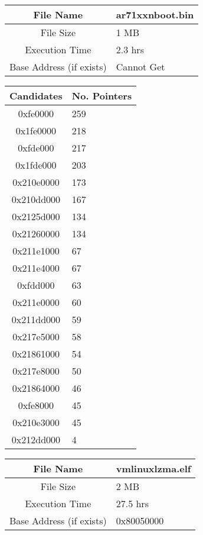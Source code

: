\documentclass[letterpaper,twocolumn,10pt]{article}
\begin{document}
\begin{center}
    \begin{tabular}{| c | p{3cm} |}
        \hline
        File Name & ar71xxnboot.bin\\ \hline
        File Size & 1 MB \\ \hline
        Execution Time & 2.3 hrs \\ \hline
        Base Address (if exists) & Cannot Get\\ \hline
    \end{tabular}
    
    \begin{tabular}{| c | p{3cm} |}
        \hline
        Candidates & No. Pointers \\ \hline
        0xfe0000 & 259 \\ \hline
        0x1fe0000 & 218 \\ \hline
        0xfde000 & 217 \\ \hline
        0x1fde000 & 203\\ \hline
        0x210e0000 & 173\\ \hline
        0x210dd000 & 167\\ \hline
        0x2125d000 & 134\\ \hline
        0x21260000 & 134\\ \hline
        0x211e1000 & 67\\ \hline
        0x211e4000 & 67\\ \hline
        0xfdd000 & 63\\ \hline
        0x211e0000 & 60\\ \hline
        0x211dd000 & 59\\ \hline
        0x217e5000 & 58\\ \hline
        0x21861000 & 54\\ \hline
        0x217e8000 & 50\\ \hline
        0x21864000 & 46\\ \hline
        0xfe8000 & 45\\ \hline
        0x210e3000 & 45\\ \hline
        0x212dd000 & 4\\ \hline
    \end{tabular}
        
    \begin{tabular}{| c | p{3cm} |}
        \hline
        File Name & vmlinuxlzma.elf\\ \hline
        File Size & 2 MB \\ \hline
        Execution Time & 27.5 hrs \\ \hline
        Base Address (if exists) & 0x80050000\\ \hline
    \end{tabular}
    

\end{center}
\end{document}
